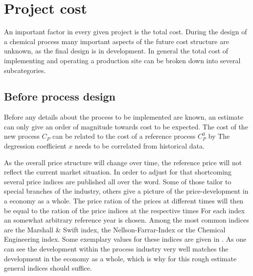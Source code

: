 \section{Project cost}
\label{sec:ProjectCost}

An important factor in every given project is the total cost. During the design of a chemical process many
important aspects of the future cost structure are unknown, as the final design is in development.
In general the total cost of implementing and operating a production site can be broken down into
several subcategories.

%

\subsection{Before process design}
\label{sec:before}
Before any details about the process to be implemented are known, an estimate can only give an
order of magnitude towards cost to be expected. The cost of the new process $C_P$ can be
related to the cost of a reference process $C_{P}^0$ by
%
The degression coefficient $x$ needs to be correlated from historical data.

As the overall price structure will change over time, the reference price will not reflect the current
market situation. In order to adjust for that shortcoming several price indices are published
all over the word. Some of those tailor to special branches of the industry, others give a picture
of the price-development in a economy as a whole. The price ration of the prices at different times
will then be equal to the ration of the price indices at the respective times
%
For each index an somewhat arbitrary reference year is chosen. Among the most common indices are the
Marshall \& Swift index, the Nellson-Farrar-Index or the Chemical Engineering index. Some exemplary
values for these indices are given in . As one can see the development within the
process industry very well matches the development in the economy as a whole, which is why for this rough
estimate general indices should suffice.

